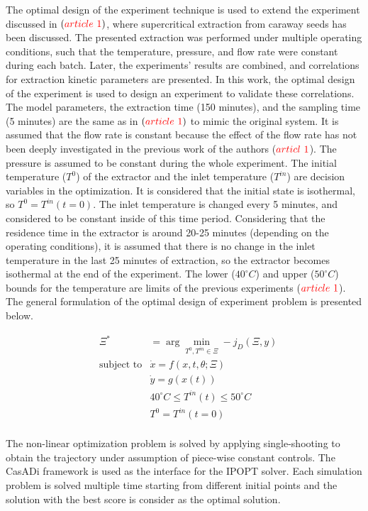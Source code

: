 \documentclass[../Article_Design_of_Experiment.tex]{subfiles}
\begin{document}
	The optimal design of the experiment technique is used to extend the experiment discussed in $({\color{red}article~1})$, where supercritical extraction from caraway seeds has been discussed. The presented extraction was performed under multiple operating conditions, such that the temperature, pressure, and flow rate were constant during each batch. Later, the experiments' results are combined, and correlations for extraction kinetic parameters are presented. In this work, the optimal design of the experiment is used to design an experiment to validate these correlations. The model parameters, the extraction time (150 minutes), and the sampling time (5 minutes) are the same as in $({\color{red}article~1})$ to mimic the original system. It is assumed that the flow rate is constant because the effect of the flow rate has not been deeply investigated in the previous work of the authors (${\color{red}articl~1}$). The pressure is assumed to be constant during the whole experiment. The initial temperature ($T^0$) of the extractor and the inlet temperature ($T^{in}$) are decision variables in the optimization. It is considered that the initial state is isothermal, so $T^0=T^{in}(t=0)$. The inlet temperature is changed every 5 minutes, and considered to be constant inside of this time period. Considering that the residence time in the extractor is around 20-25 minutes (depending on the operating conditions), it is assumed that there is no change in the inlet temperature in the last 25 minutes of extraction, so the extractor becomes isothermal at the end of the experiment. The lower ($40^\circ C$) and upper ($50^\circ C$) bounds for the temperature are limits of the previous experiments (${\color{red}article~1}$). The general formulation of the optimal design of experiment problem is presented below.
	
	{\footnotesize
	\begin{equation}
		\begin{aligned} 
			&\Xi^* &= \arg \min_{ T^0, T^{in} \in \Xi} -j_D(\Xi,y)  \\
			&\text{subject to}
			& \dot{x} = f(x,t,\theta;\Xi) \\
			&& \dot{y} = g(x(t)) \\
			&& 40^\circ C \leq T^{in}(t) \leq 50^\circ C \\
			&& T^{0} = T^{in}(t=0) \\
		\end{aligned}
	\end{equation} } 
	
	The non-linear optimization problem is solved by applying single-shooting to obtain the trajectory under assumption of piece-wise constant controls. The CasADi framework is used as the interface for the IPOPT solver. Each simulation problem is solved multiple time starting from different initial points and the solution with the best score is consider as the optimal solution.
\end{document}
